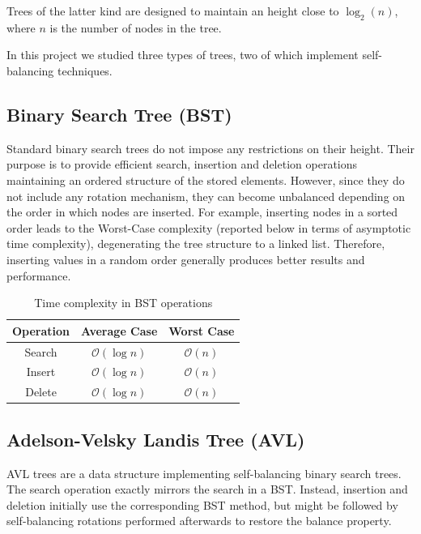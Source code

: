 \documentclass[12pt,a4paper]{article}
\begin{document}
        Trees of the latter kind are designed to maintain an height close to $\log_2(n)$, where $n$ is the number of nodes in the tree.

        In this project we studied three types of trees, two of which implement self-balancing techniques.

    \subsection{Binary Search Tree (BST)}

        Standard binary search trees do not impose any restrictions on their height. Their purpose is to provide efficient search, insertion and deletion operations maintaining an ordered structure of the stored elements. However, since they do not include any rotation mechanism, they can become unbalanced depending on the order in which nodes are inserted. For example, inserting nodes in a sorted order leads to the Worst-Case complexity (reported below in terms of asymptotic time complexity), degenerating the tree structure to a linked list. Therefore, inserting values in a random order generally produces better results and performance.

    \begin{table}[ht]
        \centering
            \begin{tabular}{c|c|c}
                \hline
                \textbf{Operation} & \textbf{Average Case} & \textbf{Worst Case} \\
                \hline
                Search & $\mathcal{O}(\log n)$ & $\mathcal{O}(n)$ \\
                Insert & $\mathcal{O}(\log n)$ & $\mathcal{O}(n)$ \\
                Delete & $\mathcal{O}(\log n)$ & $\mathcal{O}(n)$ \\
                \hline
            \end{tabular}
            \caption{Time complexity in BST operations}
    \end{table}



    \subsection{Adelson-Velsky Landis Tree (AVL)}

        AVL trees are a data structure implementing self-balancing binary search trees. The search operation exactly mirrors the search in a BST. Instead, insertion and deletion initially use the corresponding BST method, but might be followed by self-balancing rotations performed afterwards to restore the balance property.
        
\end{document}
